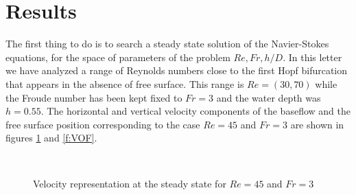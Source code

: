 \documentclass[%
 reprint,
 amsmath,amssymb,
 aps,
prl
]{revtex4-1}
\begin{document}
\section{Results}
\label{S:Results}

The first thing to do is to search a steady state solution of the Navier-Stokes equations, for the space of parameters of the problem $Re,Fr,h/D$. In this letter we have analyzed a range of Reynolds numbers close to the first Hopf bifurcation that appears in the absence of free surface. This range is $Re=(30,70)$ while the Froude number has been kept fixed to $Fr=3$ and the water depth was $h=0.55$. The horizontal and vertical velocity components of the baseflow and the free surface position corresponding to the case $Re=45$ and $Fr=3$ are shown in figures \ref{f:baseflow} and \ref{f:VOF}.

\begin{figure}[ht]
  \centering
     \\
   \caption{Velocity representation at the steady state for $Re=45$ and $Fr=3$}
   \label{f:baseflow}
\end{figure}
\end{document}
